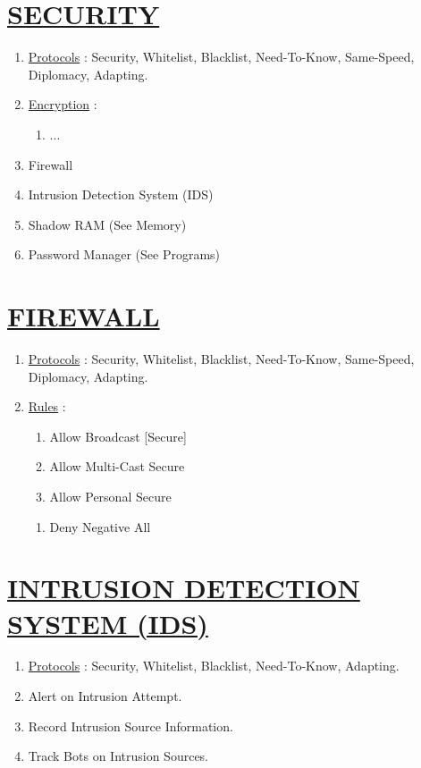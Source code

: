 \documentclass[11pt]{article}
\begin{document}
\section*{\ul{SECURITY}}
\begin{enumerate}
	\item[] \ul{Protocols} : Security, Whitelist, Blacklist, Need-To-Know, Same-Speed, Diplomacy, Adapting.
	\item[] \ul{Encryption} :
	\begin{enumerate}
		\item[] ...
	\end{enumerate}
	\item[] Firewall
	\item[] Intrusion Detection System (IDS)
	\item[] Shadow RAM (See Memory)
	\item[] Password Manager (See Programs)
\end{enumerate}


\section*{\ul{FIREWALL}}
\begin{enumerate}
	\item[] \ul{Protocols} : Security, Whitelist, Blacklist, Need-To-Know, Same-Speed, Diplomacy, Adapting.

	\item[] \ul{Rules} :
	\begin{enumerate}
		\item[] Allow Broadcast [Secure]
		\item[] Allow Multi-Cast Secure
		\item[] Allow Personal Secure
	\end{enumerate}

	\begin{enumerate}
		\item[] Deny Negative All
	\end{enumerate}
	
\end{enumerate}


\section*{\ul{INTRUSION DETECTION SYSTEM (IDS)}}
\begin{enumerate}
	\item[] \ul{Protocols} : Security, Whitelist, Blacklist, Need-To-Know, Adapting.
	\item[] Alert on Intrusion Attempt.
	\item[] Record Intrusion Source Information.
	\item[] Track Bots on Intrusion Sources.
\end{enumerate}
\end{document}
